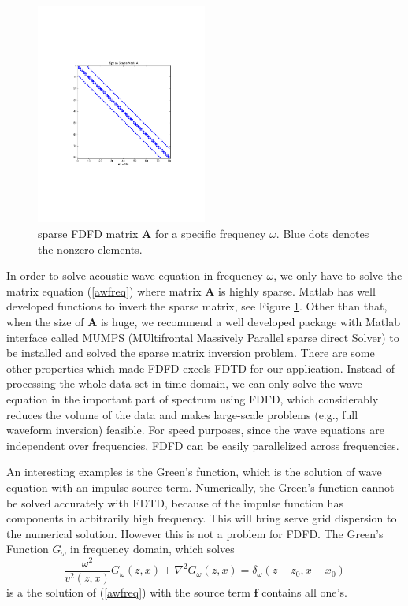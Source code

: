 \documentclass[12pt]{article}
\newcommand{\bA}{\boldsymbol{A}}
\newcommand{\bff}{\boldsymbol{f}}
\theoremstyle{plain}
\theoremstyle{definition}
\theoremstyle{remark}
\numberwithin{equation}{section}
\begin{document}
  \begin{figure}
  \centering
  \includegraphics[width=0.5\textwidth]{Fig/FDFDMatrixA.pdf}
  \caption{sparse FDFD matrix $\bA$ for a specific frequency $\omega$. Blue dots denotes the nonzero elements.}
  \label{fig:SparseA}
  \end{figure}
  In order to solve acoustic wave equation in frequency $\omega$, we only have to solve the matrix equation (\ref{awfreq}) where 
  matrix $\bA$ is highly sparse. Matlab has well developed functions to invert the sparse matrix, see Figure \ref{fig:SparseA}. 
  Other than that, when the size of $\bA$ is huge, we recommend a well developed package with Matlab interface called MUMPS (MUltifrontal Massively Parallel sparse direct Solver) to be installed and solved the sparse matrix inversion problem. 
  There are some other properties which made FDFD excels FDTD for our application. Instead of processing the whole data set in time domain,
  we can only solve the wave equation in the important part of spectrum using FDFD, which considerably reduces the volume of the data and makes large-scale problems (e.g., full waveform inversion) feasible. For speed purposes, since the wave equations are independent over frequencies, FDFD can be easily parallelized across frequencies.

An interesting examples is the Green's function, which is the solution of wave equation with an impulse source term. Numerically,
the Green's function cannot be solved accurately with FDTD, because of the impulse function has components in arbitrarily high
frequency. This will bring serve grid dispersion to the numerical solution. However this is not a problem for FDFD. The Green's Function 
$G_{\omega}$ in frequency domain, which solves  
  \begin{equation}
  \frac{\omega^2}{v^2(z, x)}G_{\omega}(z, x) + \nabla^2 G_{\omega}(z, x) = \delta_{\omega}(z-z_0, x-x_0)
  \end{equation}
  is a the solution of (\ref{awfreq}) with the source term $\bff$ contains all one's.
  
\end{document}
